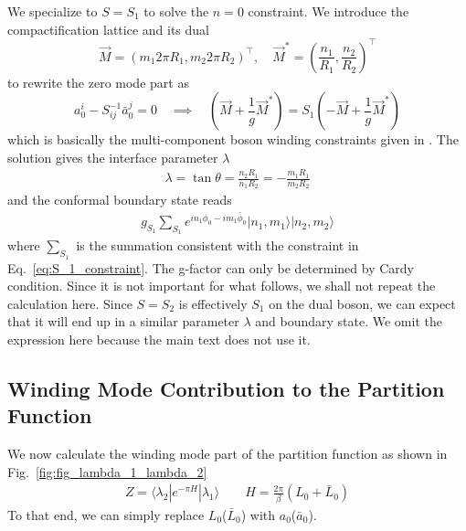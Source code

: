 We specialize to $S = S_1$ to solve the $ n = 0$ constraint. We introduce the compactification lattice and its dual\cite{affleck_quantum_2001,oshikawa_boundary_2010}
\begin{equation}
\label{eq:lattice}
\vec{M} = (m_1 2 \pi R_1, m_2 2\pi  R_2)^\top, \quad  \vec{M}^* = (\frac{n_1}{R_1}, \frac{n_2}{R_2})^\top
\end{equation}
to rewrite the zero mode part as 
\begin{equation}
  a_0^i - S^{-1} _{ij} \bar{a}_{0}^j = 0 \quad \implies \quad ( \vec{M} + \frac{1}{g}\vec{M}^* ) = S_1 ( -\vec{M} + \frac{1}{g}\vec{M}^* )
\end{equation}
which is basically the multi-component boson winding constraints given in . The solution gives the interface parameter $\lambda$
\begin{equation}
\begin{aligned}
\label{eq:S_1_constraint}
\lambda = \tan\theta=\frac{n_2R_1}{n_1R_2}=-\frac{m_1R_1}{m_2R_2}
\end{aligned}
\end{equation}
and the conformal boundary state reads
\begin{equation}\begin{aligned}
g_{S_1}\sum_{S_1}e^{in_1\phi_0-im_1\bar{\phi}_0}|n_1,m_1\rangle|n_2,m_2\rangle
\end{aligned}\end{equation}
where $\sum_{S_1}$ is the summation consistent with the constraint in Eq.~\eqref{eq:S_1_constraint}. The g-factor can only be determined by Cardy condition\cite{cardy_boundary_2004}. Since it is not important for what follows, we shall not repeat the calculation here. Since $S = S_2$ is effectively $S_1$ on the dual boson, we can expect that it will end up in a similar parameter $\lambda$ and boundary state. We omit the expression here because the main text does not use it. 

\subsection{Winding Mode Contribution to the Partition Function}
\label{app_sub:winding_contribution}
We now calculate the winding mode part of the partition function as shown in Fig.~\ref{fig:fig_lambda_1_lambda_2}
\begin{equation}\begin{aligned}
Z=\langle\lambda_2|e^{-\pi H}|\lambda_1\rangle\qquad H=\frac{2\pi}{\beta}(L_0+\bar{L}_0)
\end{aligned}\end{equation}
To that end, we can simply replace $L_0$($\bar{L}_0$) with $a_0$($\bar{a}_0$). 

